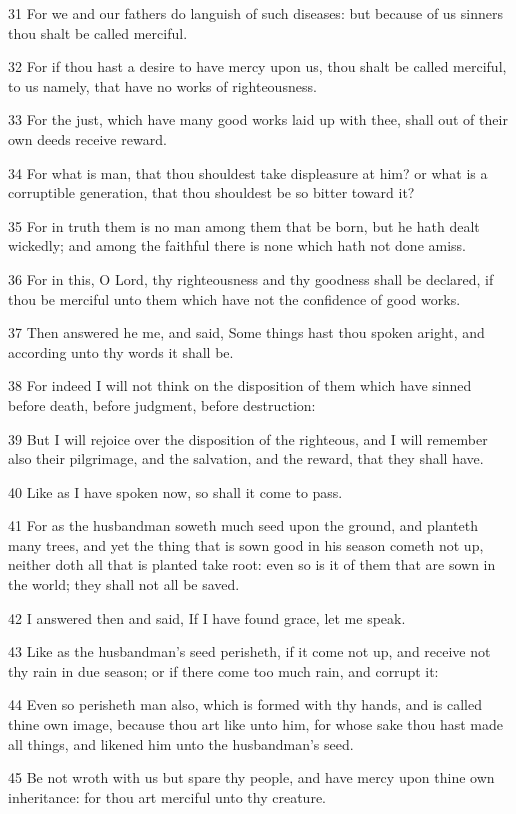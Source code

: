 \par 31 For we and our fathers do languish of such diseases: but because of us sinners thou shalt be called merciful.
\par 32 For if thou hast a desire to have mercy upon us, thou shalt be called merciful, to us namely, that have no works of righteousness.
\par 33 For the just, which have many good works laid up with thee, shall out of their own deeds receive reward.
\par 34 For what is man, that thou shouldest take displeasure at him? or what is a corruptible generation, that thou shouldest be so bitter toward it?
\par 35 For in truth them is no man among them that be born, but he hath dealt wickedly; and among the faithful there is none which hath not done amiss.
\par 36 For in this, O Lord, thy righteousness and thy goodness shall be declared, if thou be merciful unto them which have not the confidence of good works.
\par 37 Then answered he me, and said, Some things hast thou spoken aright, and according unto thy words it shall be.
\par 38 For indeed I will not think on the disposition of them which have sinned before death, before judgment, before destruction:
\par 39 But I will rejoice over the disposition of the righteous, and I will remember also their pilgrimage, and the salvation, and the reward, that they shall have.
\par 40 Like as I have spoken now, so shall it come to pass.
\par 41 For as the husbandman soweth much seed upon the ground, and planteth many trees, and yet the thing that is sown good in his season cometh not up, neither doth all that is planted take root: even so is it of them that are sown in the world; they shall not all be saved.
\par 42 I answered then and said, If I have found grace, let me speak.
\par 43 Like as the husbandman's seed perisheth, if it come not up, and receive not thy rain in due season; or if there come too much rain, and corrupt it:
\par 44 Even so perisheth man also, which is formed with thy hands, and is called thine own image, because thou art like unto him, for whose sake thou hast made all things, and likened him unto the husbandman's seed.
\par 45 Be not wroth with us but spare thy people, and have mercy upon thine own inheritance: for thou art merciful unto thy creature.
